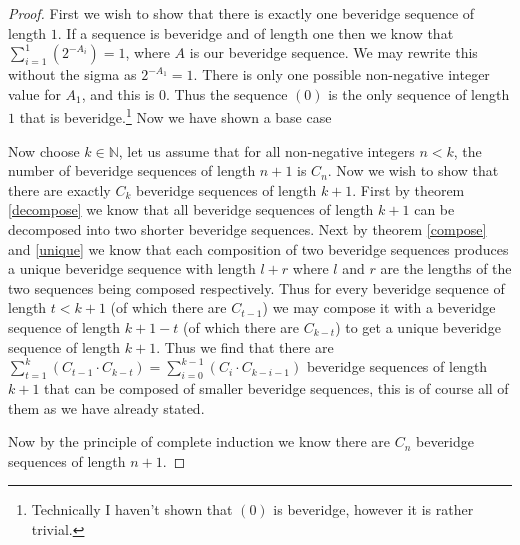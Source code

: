 \documentclass{macjourn}
\def\useLim{}
\newcommand{\sumfrom}[3]{\sum\useLim_{#1}^{#2} \left( {#3} \right)}
\theoremstyle{definition}
\begin{document}
	\begin{proof}
		First we wish to show that there is exactly one beveridge sequence of length $1$. If a sequence is beveridge and of length one then we know that $\sumfrom{i=1}1{2^{-A_i}} = 1$, where $A$ is our beveridge sequence. We may rewrite this without the sigma as $2^{-A_1} = 1$. There is only one possible non-negative integer value for $A_1$, and this is $0$. Thus the sequence $(0)$ is the only sequence of length $1$ that is beveridge.\footnote{Technically I haven't shown that $(0)$ is beveridge, however it is rather trivial.} Now we have shown a base case
		
		Now choose $k \in \mathbb N$, let us assume that for all non-negative integers $n < k$, the number of beveridge sequences of length $n + 1$ is $C_n$. Now we wish to show that there are exactly $C_{k}$ beveridge sequences of length $k + 1$. First by theorem \ref{decompose} we know that all beveridge sequences of length $k+ 1$ can be decomposed into two shorter beveridge sequences. Next by theorem \ref{compose} and \ref{unique} we know that each composition of two beveridge sequences produces a unique beveridge sequence with length $l+r$ where $l$ and $r$ are the lengths of the two sequences being composed respectively. Thus for every beveridge sequence of length $t<k + 1$ (of which there are $C_{t-1}$) we may compose it with a beveridge sequence of length $k + 1 - t$ (of which there are $C_{k-t}$) to get a unique beveridge sequence of length $k + 1$. Thus we find that there are $\sumfrom{t=1}{k}{C_{t-1}\cdot C_{k-t}} = \sumfrom{i=0}{k-1}{C_{i}\cdot C_{k-i-1}}$ beveridge sequences of length $k + 1$ that can be composed of smaller beveridge sequences, this is of course all of them as we have already stated.
		
		Now by the principle of complete induction we know there are $C_n$ beveridge sequences of length $n + 1$.
	\end{proof}
	
	
	
\end{document}
